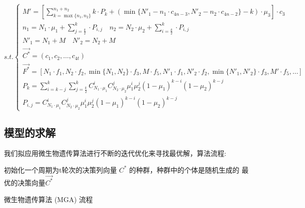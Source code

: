 \documentclass[withoutpreface,bwprint]{cumcmthesis} %
\begin{document}
\begin{equation*}
	s.t.\begin{cases}
		M'=[\sum_{k=\max \{n_{1},n_{2}\}}^{n_{1}+n_{2}}k\cdot P_{k}+(\min \{N'_{1}-n_{1}\cdot c_{4n-3},N'_{2}-n_{2}\cdot c_{4n-2}\}-k)\cdot \mu_{3}]\cdot c_{3}\\
		n_{1}=N_{1}\cdot \mu_{1}+\sum_{j=\frac{k}{2}}^{k}\cdot P_{i,j} \quad n_{2}=N_{2}\cdot \mu_{2}+\sum_{i=\frac{k}{2}}^{k}\cdot P_{i,j}\\
		N'_{1}=N_{1}+M \quad N'_{2}=N_{2}+M \\
		\vec{C^{*}}=(c_{1},c_{2},\dots,c_{4t})\\
		\vec{F^{*}}=[N_{1}\cdot f_{1},N_{2}\cdot f_{2},\min \{N_{1},N_{2}\}\cdot f_{3},M\cdot f_{5},N'_{1}\cdot f_{1},N'_{2}\cdot f_{2},\min \{N'_{1},N'_{2}\}\cdot f_{3},M'\cdot f_{5},\dots]\\
		P_{k}=\sum_{i=k-j}^{k}\sum_{j=\frac{k}{2}}^{k}C_{N_{1}\cdot\mu_{1}}^{i}C_{N_{2}\cdot\mu_{2}}^{j}\mu_{1}^{i}\mu_{2}^{j}(1-\mu_{1})^{k-i}(1-\mu_{2})^{k-j}\\
		P_{i,j}=C_{N_{1}\cdot\mu_{1}}^{i}C_{N_{2}\cdot\mu_{2}}^{j}\mu_{1}^{i}\mu_{2}^{j}(1-\mu_{1})^{k-i}(1-\mu_{2})^{k-j}
	\end{cases}
\end{equation*}
\subsection{模型的求解}
我们拟应用微生物遗传算法进行不断的迭代优化来寻找最优解，算法流程:

\begin{adjustbox}{width=16cm,height=6.5cm}
	\centering
	\begin{algorithm}[H]
		\SetAlgoLined
		初始化一个周期为t轮次的决策列向量 $C^{*}$ 的种群，种群中的个体是随机生成的\;
		\Return 最优的决策向量$\vec{C^{*}}$
		\label{alg:sprt}
		\caption{微生物遗传算法 (MGA) 流程}
	\end{algorithm}
\end{adjustbox}
\end{document}
